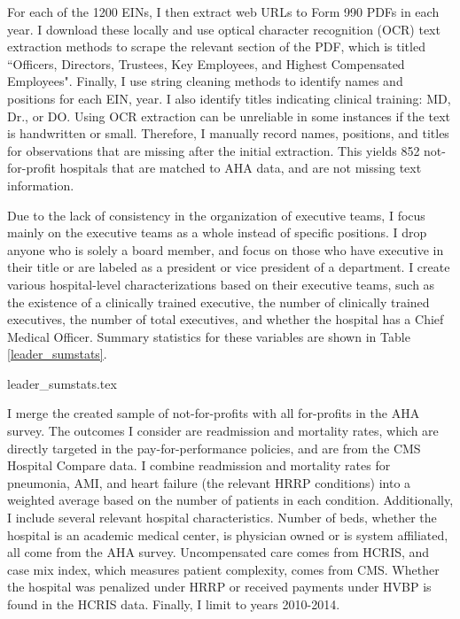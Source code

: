 \documentclass[12pt]{article}
\begin{document}
    For each of the 1200 EINs, I then extract web URLs to Form 990 PDFs in each year. I download these locally and use optical character recognition (OCR) text extraction methods to scrape the relevant section of the PDF, which is titled ``Officers, Directors, Trustees, Key Employees, and Highest Compensated Employees". Finally, I use string cleaning methods to identify names and positions for each EIN, year. I also identify titles indicating clinical training: MD, Dr., or DO. Using OCR extraction can be unreliable in some instances if the text is handwritten or small. Therefore, I manually record names, positions, and titles for observations that are missing after the initial extraction. This yields 852 not-for-profit hospitals that are matched to AHA data, and are not missing text information. 

    Due to the lack of consistency in the organization of executive teams, I focus mainly on the executive teams as a whole instead of specific positions. I drop anyone who is solely a board member, and focus on those who have executive in their title or are labeled as a president or vice president of a department. I create various hospital-level characterizations based on their executive teams, such as the existence of a clinically trained executive, the number of clinically trained executives, the number of total executives, and whether the hospital has a Chief Medical Officer. Summary statistics for these variables are shown in Table \ref{leader_sumstats}.

    {leader_sumstats.tex}

    I merge the created sample of not-for-profits with all for-profits in the AHA survey. The outcomes I consider are readmission and mortality rates, which are directly targeted in the pay-for-performance policies, and are from the CMS Hospital Compare data. I combine readmission and mortality rates for pneumonia, AMI, and heart failure (the relevant HRRP conditions) into a weighted average based on the number of patients in each condition. Additionally, I include several relevant hospital characteristics. Number of beds, whether the hospital is an academic medical center, is physician owned or is system affiliated, all come from the AHA survey. Uncompensated care comes from HCRIS, and case mix index, which measures patient complexity, comes from CMS. Whether the hospital was penalized under HRRP or received payments under HVBP is found in the HCRIS data. Finally, I limit to years 2010-2014.

\end{document}

